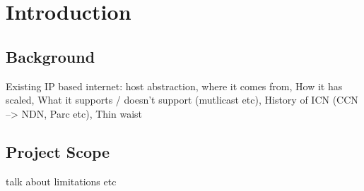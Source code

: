 \chapter{Introduction}
\cite{nfd-dev-guide}
\section{Background}
Existing IP based internet: host abstraction, where it comes from, How it has scaled, What it supports / doesn't support (mutlicast etc), History of ICN (CCN --> NDN, Parc etc), Thin waist

\section{Project Scope}
talk about limitations etc